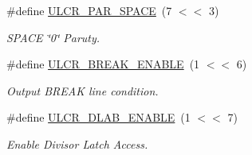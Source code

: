 \begin{DoxyCompactItemize}
\mbox{\label{group__rtl22xx__uart_ga752911291a67ad3f998151181a891ae9}} 
\#define \mbox{\hyperlink{group__rtl22xx__uart_ga752911291a67ad3f998151181a891ae9}{U\+L\+C\+R\+\_\+\+P\+A\+R\+\_\+\+S\+P\+A\+CE}}~(7 $<$$<$ 3)
\begin{DoxyCompactList}\small\item\em S\+P\+A\+CE \char`\"{}0\char`\"{} Paruty. \end{DoxyCompactList}\item 
\mbox{\label{group__rtl22xx__uart_ga0d81d677903d3a5003c69d656ffe2bf8}} 
\#define \mbox{\hyperlink{group__rtl22xx__uart_ga0d81d677903d3a5003c69d656ffe2bf8}{U\+L\+C\+R\+\_\+\+B\+R\+E\+A\+K\+\_\+\+E\+N\+A\+B\+LE}}~(1 $<$$<$ 6)
\begin{DoxyCompactList}\small\item\em Output B\+R\+E\+AK line condition. \end{DoxyCompactList}\item 
\mbox{\label{group__rtl22xx__uart_ga75a5f63558ad3fbbdd4e29d500ee5f2d}} 
\#define \mbox{\hyperlink{group__rtl22xx__uart_ga75a5f63558ad3fbbdd4e29d500ee5f2d}{U\+L\+C\+R\+\_\+\+D\+L\+A\+B\+\_\+\+E\+N\+A\+B\+LE}}~(1 $<$$<$ 7)
\begin{DoxyCompactList}\small\item\em Enable Divisor Latch Access. \end{DoxyCompactList}\end{DoxyCompactItemize}

